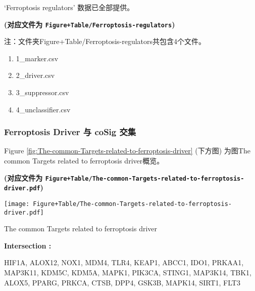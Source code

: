 \documentclass[
]{article}
\providecommand{\tightlist}{%
  \setlength{\itemsep}{0pt}\setlength{\parskip}{0pt}}
\begin{document}
`Ferroptosis regulators' 数据已全部提供。

\textbf{(对应文件为 \texttt{Figure+Table/Ferroptosis-regulators})}

\begin{center}\begin{tcolorbox}[colback=gray!10, colframe=gray!50, width=0.9\linewidth, arc=1mm, boxrule=0.5pt]注：文件夹Figure+Table/Ferroptosis-regulators共包含4个文件。

\begin{enumerate}\tightlist
\item 1\_marker.csv
\item 2\_driver.csv
\item 3\_suppressor.csv
\item 4\_unclassifier.csv
\end{enumerate}\end{tcolorbox}
\end{center}

\hypertarget{ferroptosis-driver-ux4e0e-cosig-ux4ea4ux96c6}{%
\subsubsection{Ferroptosis Driver 与 coSig 交集}\label{ferroptosis-driver-ux4e0e-cosig-ux4ea4ux96c6}}

Figure \ref{fig:The-common-Targets-related-to-ferroptosis-driver} (下方图) 为图The common Targets related to ferroptosis driver概览。

\textbf{(对应文件为 \texttt{Figure+Table/The-common-Targets-related-to-ferroptosis-driver.pdf})}

\def\@captype{figure}
\begin{center}
\texttt{[image: Figure+Table/The-common-Targets-related-to-ferroptosis-driver.pdf]}
\caption{The common Targets related to ferroptosis driver}\label{fig:The-common-Targets-related-to-ferroptosis-driver}
\end{center}
\begin{center}\begin{tcolorbox}[colback=gray!10, colframe=gray!50, width=0.9\linewidth, arc=1mm, boxrule=0.5pt]
\textbf{
Intersection
:}

\vspace{0.5em}

    HIF1A, ALOX12, NOX1, MDM4, TLR4, KEAP1, ABCC1, IDO1,
PRKAA1, MAP3K11, KDM5C, KDM5A, MAPK1, PIK3CA, STING1,
MAP3K14, TBK1, ALOX5, PPARG, PRKCA, CTSB, DPP4, GSK3B,
MAPK14, SIRT1, FLT3

\vspace{2em}
\end{tcolorbox}
\end{center}
\end{document}
